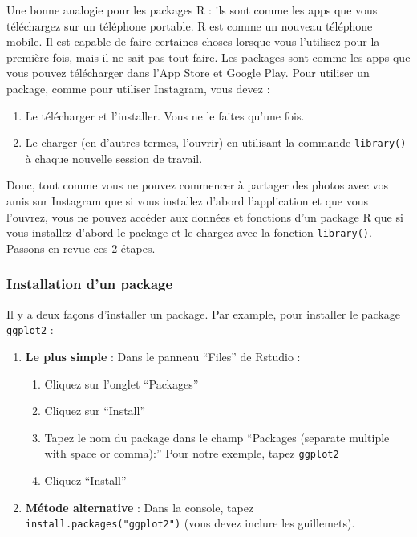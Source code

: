 \documentclass[
  a4paper,
]{article}
\providecommand{\tightlist}{%
  \setlength{\itemsep}{0pt}\setlength{\parskip}{0pt}}
\begin{document}
Une bonne analogie pour les packages R : ils sont comme les apps que vous téléchargez sur un téléphone portable. R est comme un nouveau téléphone mobile. Il est capable de faire certaines choses lorsque vous l'utilisez pour la première fois, mais il ne sait pas tout faire. Les packages sont comme les apps que vous pouvez télécharger dans l'App Store et Google Play. Pour utiliser un package, comme pour utiliser Instagram, vous devez :

\begin{enumerate}
\def\labelenumi{\arabic{enumi}.}
\tightlist
\item
  Le télécharger et l'installer. Vous ne le faites qu'une fois.
\item
  Le charger (en d'autres termes, l'ouvrir) en utilisant la commande \texttt{library()} à chaque nouvelle session de travail.
\end{enumerate}

Donc, tout comme vous ne pouvez commencer à partager des photos avec vos amis sur Instagram que si vous installez d'abord l'application et que vous l'ouvrez, vous ne pouvez accéder aux données et fonctions d'un package R que si vous installez d'abord le package et le chargez avec la fonction \texttt{library()}. Passons en revue ces 2 étapes.

\hypertarget{installation-dun-package}{%
\subsubsection{Installation d'un package}\label{installation-dun-package}}

Il y a deux façons d'installer un package. Par example, pour installer le package \texttt{ggplot2} :

\begin{enumerate}
\def\labelenumi{\arabic{enumi}.}
\tightlist
\item
  \textbf{Le plus simple} : Dans le panneau ``Files'' de Rstudio :

  \begin{enumerate}
  \def\labelenumii{\alph{enumii})}
  \tightlist
  \item
    Cliquez sur l'onglet ``Packages''
  \item
    Cliquez sur ``Install''
  \item
    Tapez le nom du package dans le champ ``Packages (separate multiple with space or comma):'' Pour notre exemple, tapez \texttt{ggplot2}
  \item
    Cliquez ``Install''
  \end{enumerate}
\item
  \textbf{Métode alternative} : Dans la console, tapez \texttt{install.packages("ggplot2")} (vous devez inclure les guillemets).
\end{enumerate}
\end{document}
